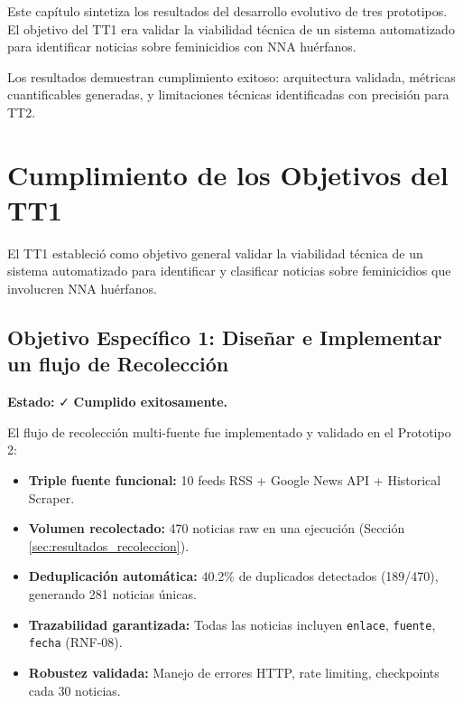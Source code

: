 
Este capítulo sintetiza los resultados del desarrollo evolutivo de tres prototipos. El objetivo del TT1 era validar la viabilidad técnica de un sistema automatizado para identificar noticias sobre feminicidios con NNA huérfanos.

Los resultados demuestran cumplimiento exitoso: arquitectura validada, métricas cuantificables generadas, y limitaciones técnicas identificadas con precisión para TT2.

\section{Cumplimiento de los Objetivos del TT1}
\label{sec:cumplimiento_objetivos}

El TT1 estableció como objetivo general validar la viabilidad técnica de un sistema automatizado para identificar y clasificar noticias sobre feminicidios que involucren NNA huérfanos.

\subsection{Objetivo Específico 1: Diseñar e Implementar un flujo de Recolección}
\label{subsec:obj1_cumplido}

\textbf{Estado:} ✓ \textbf{Cumplido exitosamente.}

El flujo de recolección multi-fuente fue implementado y validado en el Prototipo 2:

\begin{itemize}
    \item \textbf{Triple fuente funcional:} 10 feeds RSS + Google News API + Historical Scraper.
    \item \textbf{Volumen recolectado:} 470 noticias raw en una ejecución (Sección \ref{sec:resultados_recoleccion}).
    \item \textbf{Deduplicación automática:} 40.2\% de duplicados detectados (189/470), generando 281 noticias únicas.
    \item \textbf{Trazabilidad garantizada:} Todas las noticias incluyen \texttt{enlace}, \texttt{fuente}, \texttt{fecha} (RNF-08).
    \item \textbf{Robustez validada:} Manejo de errores HTTP, rate limiting, checkpoints cada 30 noticias.
\end{itemize}

